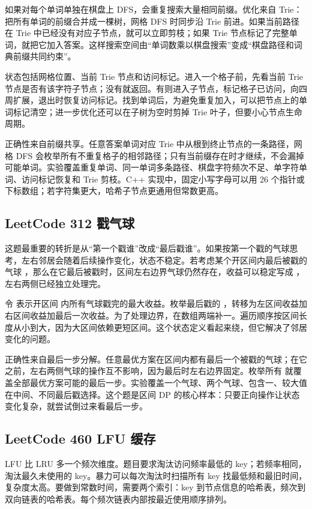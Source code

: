 如果对每个单词单独在棋盘上 DFS，会重复搜索大量相同前缀。优化来自 Trie：把所有单词的前缀合并成一棵树，网格 DFS 时同步沿 Trie 前进。如果当前路径在 Trie 中已经没有对应子节点，就可以立即剪枝；如果 Trie 节点标记了完整单词，就把它加入答案。这样搜索空间由“单词数乘以棋盘搜索”变成“棋盘路径和词典前缀共同约束”。

状态包括网格位置、当前 Trie 节点和访问标记。进入一个格子前，先看当前 Trie 节点是否有该字符子节点；没有就返回。有则进入子节点，标记格子已访问，向四周扩展，退出时恢复访问标记。找到单词后，为避免重复加入，可以把节点上的单词标记清空；进一步优化还可以在子树为空时剪掉 Trie 叶子，但要小心节点生命周期。

正确性来自前缀共享。任意答案单词对应 Trie 中从根到终止节点的一条路径，网格 DFS 会枚举所有不重复格子的相邻路径；只有当前缀存在时才继续，不会漏掉可能单词。实验覆盖重复单词、同一单词多条路径、棋盘字符频次不足、单字符单词、访问标记恢复和 Trie 剪枝。C++ 实现中，固定小写字母可以用 26 个指针或下标数组；若字符集更大，哈希子节点更通用但常数更高。

\subsection{LeetCode 312 戳气球}

这题最重要的转折是从“第一个戳谁”改成“最后戳谁”。如果按第一个戳的气球思考，左右邻居会随着后续操作变化，状态不稳定。若考虑某个开区间内最后被戳的气球 ，那么在它最后被戳时，区间左右边界气球仍然存在，收益可以稳定写成 ，左右两侧已经独立处理完。

令  表示开区间  内所有气球戳完的最大收益。枚举最后戳的 ，转移为左区间收益加右区间收益加最后一次收益。为了处理边界，在数组两端补一。遍历顺序按区间长度从小到大，因为大区间依赖更短区间。这个状态定义看起来绕，但它解决了邻居变化的问题。

正确性来自最后一步分解。任意最优方案在区间内都有最后一个被戳的气球；在它之前，左右两侧气球的操作互不影响，因为最后时左右边界固定。枚举所有  就覆盖全部最优方案可能的最后一步。实验覆盖一个气球、两个气球、包含一、较大值在中间、不同最后戳选择。这个题是区间 DP 的核心样本：只要正向操作让状态变化复杂，就尝试倒过来看最后一步。

\subsection{LeetCode 460 LFU 缓存}

LFU 比 LRU 多一个频次维度。题目要求淘汰访问频率最低的 key；若频率相同，淘汰最久未使用的 key。暴力可以每次淘汰时扫描所有 key 找最低频和最旧时间，复杂度太高。要做到常数时间，需要两个索引：key 到节点信息的哈希表，频次到双向链表的哈希表。每个频次链表内部按最近使用顺序排列。

